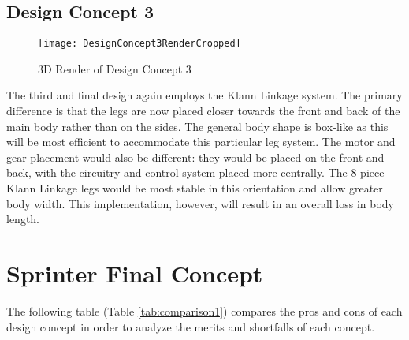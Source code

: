   \subsection{Design Concept 3}
  \label{sub:Design Concept 3}
    \begin{figure}[H]
      \begin{center}
        \texttt{[image: DesignConcept3RenderCropped]}
        \caption{3D Render of Design Concept 3}
        \label{fig:3dConcept3}
      \end{center}
    \end{figure}

    The third and final design again employs the Klann Linkage system. The primary difference is that the legs are now placed closer towards the front and back of the main body rather than on the sides. The general body shape is box-like as this will be most efficient to accommodate this particular leg system. The motor and gear placement would also be different: they would be placed on the front and back, with the circuitry and control system placed more centrally. The 8-piece Klann Linkage legs would be most stable in this orientation and allow greater body width. This implementation, however, will result in an overall loss in body length.

\section{Sprinter Final Concept}
\label{sec:Sprinter Final Concept}
  The following table (Table \ref{tab:comparison1}) compares the pros and cons of each design concept in order to analyze the merits and shortfalls of each concept.

